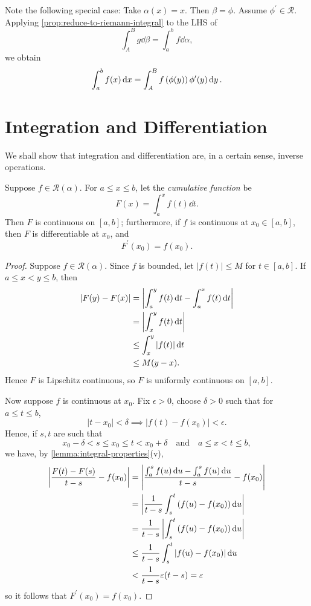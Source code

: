 Note the following special case: Take $\alpha(x)=x$. Then $\beta=\phi$. Assume $\phi^\prime\in\mathcal{R}$. Applying \ref{prop:reduce-to-riemann-integral} to the LHS of 
\[\int_A^B g\dd{\beta}=\int_a^b f\dd{\alpha},\]
we obtain
\[\int_{a}^{b}f(x)\dd{x}=\int_{A}^{B}f\left(\phi(y)\right)\phi^\prime(y)\dd{y}.\]
\pagebreak

\section{Integration and Differentiation}
We shall show that integration and differentiation are, in a certain sense, inverse operations.

\begin{theorem}
Suppose $f\in \mathcal{R}(\alpha)$. For $a\le x\le b$, let the \emph{cumulative function} be
\[F(x)=\int_a^x f(t)\dd{t}.\]
Then $F$ is continuous on $[a,b]$; furthermore, if $f$ is continuous at $x_0\in[a,b]$, then $F$ is differentiable at $x_0$, and
\[F^\prime(x_0)=f(x_0).\]
\end{theorem}

\begin{proof}
Suppose $f\in\mathcal{R}(\alpha)$. Since $f$ is bounded, let $|f(t)|\le M$ for $t\in[a,b]$. If $a\le x<y\le b$, then
\begin{align*}
|F(y)-F(x)|
&=\left|\int_{a}^{y}f(t)\dd{t}-\int_{a}^{x}f(t)\dd{t}\right|\\
&=\left|\int_{x}^{y}f(t)\dd{t}\right|\\
&\le\int_{x}^{y}|f(t)|\dd{t}\\
&\le M(y-x).
\end{align*}
Hence $F$ is Lipschitz continuous, so $F$ is uniformly continuous on $[a,b]$.

Now suppose $f$ is continuous at $x_0$. Fix $\epsilon>0$, choose $\delta>0$ such that for $a\le t\le b$,
\[|t-x_0|<\delta\implies|f(t)-f(x_0)|<\epsilon.\]
Hence, if $s,t$ are such that
\[x_0-\delta<s\le x_0\le t<x_0+\delta\quad\text{and}\quad a\le x<t\le b,\]
we have, by \ref{lemma:integral-properties}(v),
\begin{align*}
\left|\frac{F(t)-F(s)}{t-s}-f(x_0)\right|
&=\left|\frac{\int_{a}^{s}f(u)\dd{u}-\int_{a}^{s}f(u)\dd{u}}{t-s}-f(x_0)\right|\\
&=\left|\frac{1}{t-s}\int_{s}^{t}\left(f(u)-f(x_0)\right)\dd{u}\right|\\
&=\frac{1}{t-s}\left|\int_{s}^{t}\left(f(u)-f(x_0)\right)\dd{u}\right|\\
&\le\frac{1}{t-s}\int_{s}^{t}|f(u)-f(x_0)|\dd{u}\\
&<\frac{1}{t-s}\varepsilon(t-s)=\varepsilon
\end{align*}
so it follows that $F^\prime(x_0)=f(x_0)$.
\end{proof}

